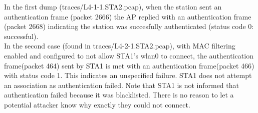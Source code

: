 In the first dump (traces/L4-1-1.STA2.pcap), when the station sent an authentication frame (packet 2666) the AP replied with an authentication frame (packet 2668) indicating the station was succesfully authenticated (status code 0: successful).\\
In the second case (found in traces/L4-2-1.STA2.pcap), with MAC filtering enabled and configured to not allow STA1's wlan0 to connect,
the authentication frame(packet 464) sent by STA1 is met with an authentication frame(packet 466)
with status code 1. This indicates an unspecified failure. STA1 does not attempt an association as authentication failed. Note that STA1 is not informed that authentication failed because it was blacklisted. There is no reason to let a potential attacker know why exactly they could not connect.
